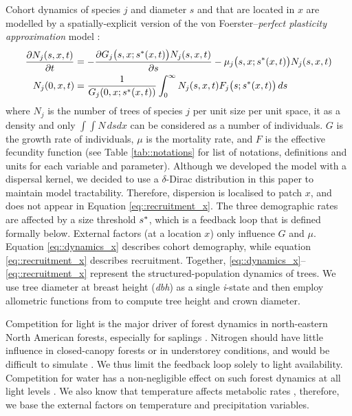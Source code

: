 Cohort dynamics of species $ j $ and diameter $ s $ and that are located in $ x $ are modelled by a spatially-explicit version of the von Foerster--\textit{perfect plasticity approximation} model \citep[hereafter, von Foerster--PPA]{Strigul2008}:
\begin{align}
	\frac{\partial N_j(s, x, t)}{\partial t} &= - \frac{\partial G_j \big(s, x; {s}^{*}(x, t) \big) N_j(s, x, t)}{\partial s} - \mu_j\big(s, x; {s}^{*}(x, t) \big) N_j(s, x, t) \label{eq::dynamics_x} \\
	N_j(0, x, t) &= \frac{1}{G_j(0, x; {s}^{*}(x, t))} \int_0^{\infty} N_j(s, x, t) F_j\big(s; {s}^{*}(x, t) \big) \, ds \label{eq::recruitment_x}
\end{align}
where $ N_j $ is the number of trees of species $ j $ per unit size per unit space, it as a density and only $ \int \int N \, ds dx $ can be considered as a number of individuals. $ G $ is the growth rate of individuals, $ \mu $ is the mortality rate, and $ F $ is the effective fecundity function (see Table \ref{tab::notations} for list of notations, definitions and units for each variable and parameter). Although we developed the model with a dispersal kernel, we decided to use a $ \delta $-Dirac distribution in this paper to maintain model tractability. Therefore, dispersion is localised to patch $ x $, and does not appear in Equation \eqref{eq::recruitment_x}. The three demographic rates are affected by a size threshold $ {s}^{*} $, which is a feedback loop that is defined formally below. External factors (at a location $ x $) only influence $ G $ and $ \mu $. Equation \eqref{eq::dynamics_x} describes cohort demography, while equation \eqref{eq::recruitment_x} describes recruitment. Together, \eqref{eq::dynamics_x}--\eqref{eq::recruitment_x} represent the structured-population dynamics of trees. We use tree diameter at breast height (\textit{\textit{dbh}}) as a single \textit{i}-state and then employ allometric functions from \citet{Purves2007} to compute tree height and crown diameter.

Competition for light is the major driver of forest dynamics in north-eastern North American forests, especially for saplings \citep{Pacala1996, Purves2007}. Nitrogen should have little influence in closed-canopy forests or in understorey conditions, and would be difficult to simulate \citep{Kobe2006}. We thus limit the feedback loop solely to light availability. Competition for water has a non-negligible effect on such forest dynamics at all light levels \citep{Kobe2006}. We also know that temperature affects metabolic rates \citep{Brown2004}, therefore, we base the external factors on temperature and precipitation variables.


